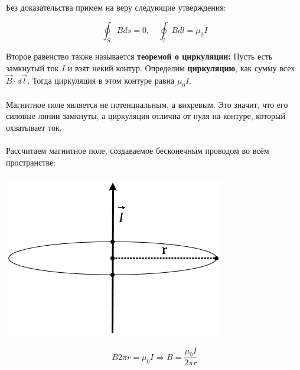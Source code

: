 \documentclass{article}
\begin{document}
\paragraph{}

Без доказательства примем на веру следующие утверждения:

\begin{equation*}
  \oint_SBds = 0, \quad \oint_lBdl = \mu_0I
\end{equation*}

Второе равенство также называется \textbf{теоремой о циркуляции:} Пусть есть замкнутый ток $I$ и взят некий контур.
Определим \textbf{циркуляцию}, как сумму всех $\vec{B}\cdot d\vec{l}$. Тогда циркуляция в этом контуре равна $\mu_0I$.

\paragraph{}

Магнитное поле является не потенциальным, а вихревым. Это значит, что его силовые линии замкнуты,
а циркуляция отлична от нуля на контуре, который охватывает ток.

\paragraph{}

Рассчитаем магнитное поле, создаваемое бесконечным проводом во всём пространстве:
\paragraph{}
\begin{minipage}{0.4\linewidth}
  \includegraphics[width=\linewidth,natwidth=364,natheight=266]{images/4.png}
\end{minipage}
\begin{minipage}{0.5\linewidth}
  \begin{equation*}
    B2\pi r = \mu_0I \Rightarrow B = \frac{\mu_0I}{2\pi r}
  \end{equation*}
\end{minipage}
\end{document}
